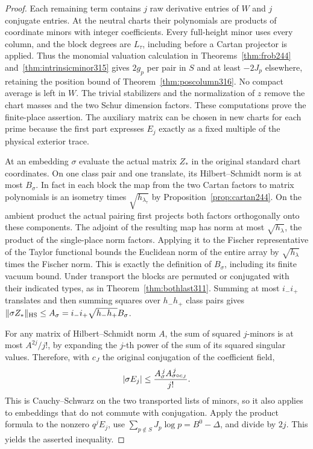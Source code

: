 \documentclass[a4paper,11pt]{article}
\theoremstyle{definition}
\theoremstyle{remark}
\numberwithin{equation}{section}
\begin{document}
\begin{proof}
Each remaining term contains \(j\) raw derivative entries
of \(W\) and \(j\) conjugate entries. At the neutral charts
their polynomials are products of coordinate minors with
integer coefficients. Every full-height minor uses every
column, and the block degrees are \(L_\tau\), including
before a Cartan projector is applied. Thus the monomial
valuation calculation in Theorems~\ref{thm:frob244}
and~\ref{thm:intrinsicminor315} gives \(2g_p\) per pair
in \(S\) and at least \(-2J_p\) elsewhere, retaining the
position bound of Theorem~\ref{thm:poscolumn316}. No compact
average is left in \(W\). The trivial stabilizers and the
normalization of \(z\) remove the chart masses and the two
Schur dimension factors. These computations prove the
finite-place assertion. The auxiliary matrix can be chosen
in new charts for each prime because the first part
expresses \(E_j\) exactly as a fixed multiple of the
physical exterior trace.

At an embedding \(\sigma\) evaluate the actual matrix
\(Z_*\) in the original standard chart coordinates. On one
class pair and one translate, its Hilbert--Schmidt norm is
at most \(B_\sigma\). In fact in each block the map from
the two Cartan factors to matrix polynomials is an isometry
times \(\sqrt{h_{\lambda_\tau}}\) by
Proposition~\ref{prop:cartan244}. On the ambient product
the actual pairing first projects both factors
orthogonally onto these components. The adjoint of the
resulting map has norm at most \(\sqrt{h_\lambda}\), the
product of the single-place norm factors. Applying it to
the Fischer representative of the Taylor functional bounds
the Euclidean norm of the entire array by
\(\sqrt{h_\lambda}\) times the Fischer norm. This is exactly
the definition of \(B_\sigma\), including its finite vacuum
bound. Under transport the blocks are permuted or conjugated
with their indicated types, as in
Theorem~\ref{thm:bothlast311}. Summing at most \(i_-i_+\)
translates and then summing squares over \(h_-h_+\) class
pairs gives \(\|\sigma Z_*\|_{\rm HS}\le
A_\sigma=i_-i_+\sqrt{h_-h_+}B_\sigma\).

For any matrix of Hilbert--Schmidt norm \(A\), the sum of
squared \(j\)-minors is at most \(A^{2j}/j!\), by expanding
the \(j\)-th power of the sum of its squared singular
values. Therefore, with \(c_J\) the original conjugation
of the coefficient field,
\[
       |\sigma E_j|\le { A_\sigma^{\,j} A_{\sigma\circ c_J}^{\,j}
                             \over j!}.
\]
This is Cauchy--Schwarz on the two transported lists of
minors, so it also applies to embeddings that do not
commute with conjugation. Apply the product formula to
the nonzero \(q^j E_j\), use
\(\sum_{p\notin S}J_p\log p=B^0-\Delta\), and divide
by \(2j\). This yields the asserted inequality.
\end{proof}
\end{document}
